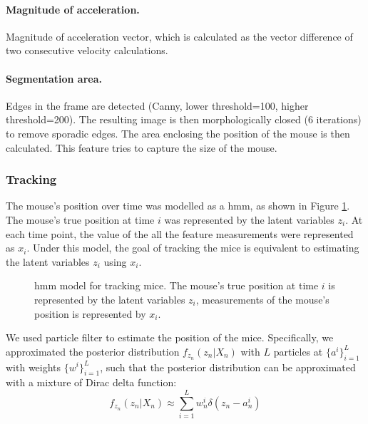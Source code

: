 \paragraph{Magnitude of acceleration.} Magnitude of acceleration vector, which is calculated as the vector difference of two consecutive velocity calculations. 

\paragraph{Segmentation area.} Edges in the frame are detected (Canny, lower threshold=100, higher threshold=200). The resulting image is then morphologically closed (6 iterations) to remove sporadic edges. The area enclosing the position of the mouse is then calculated. This feature tries to capture the size of the mouse.

\subsubsection{Tracking}

The mouse's position over time was modelled as a \gls{hmm}, as shown in Figure \ref{f.ad.hmm}. The mouse's true position at time $i$ was represented by the latent variables $z_i$. At each time point, the value of the all the feature measurements were represented as $x_i$. Under this model, the goal of tracking the mice is equivalent to estimating the latent variables $z_i$ using $x_i$. 

\begin{figure}[h]
    
    \caption[\gls{hmm} model for tracking mice.]{\gls{hmm} model for tracking mice. The mouse's true position at time $i$ is represented by the latent variables $z_i$, measurements of the mouse's position is represented by $x_i$. \label{f.ad.hmm}}
\end{figure}

We used particle filter to estimate the position of the mice. Specifically, we approximated the posterior distribution $f_{z_n}(z_n|X_n)$ with $L$ particles at $\{a^i\}_{i=1}^L$ with weights $\{w^i\}_{i=1}^L$, such that the posterior distribution can be approximated with a mixture of Dirac delta function: 
\begin{equation} \label{zn_approx}
    f_{z_n}(z_n|X_n) \approx \sum_{i=1}^Lw_n^i\delta(z_n - a_n^i)
\end{equation}

